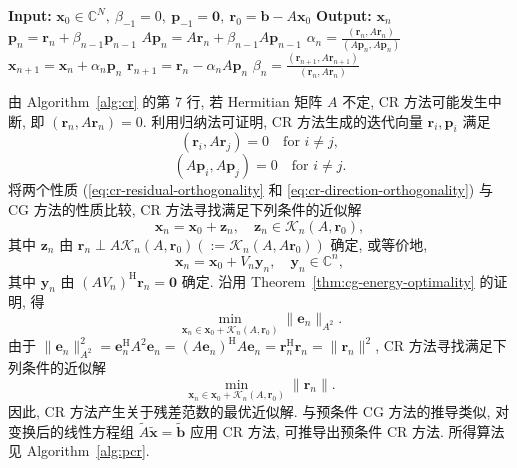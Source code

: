 \begin{algorithm}[H]\caption{{CR 方法}}\label{alg:cr}\begin{algorithmic}[1]
\Statex\textbf{Input:} $\bm x_0\in\mathbb C^N,\ \beta_{-1}=0,\ \bm p_{-1}=\bm0,\ \bm r_0=\bm b-A\bm x_0$
\Statex\textbf{Output:} $\bm x_n$
\State $\bm p_n=\bm r_n+\beta_{n-1}\bm p_{n-1}$
\State $A\bm p_n=A\bm r_n+\beta_{n-1}A\bm p_{n-1}$
\State $\alpha_n=\frac{(\bm r_n,A\bm r_n)}{(A\bm p_n,A\bm p_n)}$
\State $\bm x_{n+1}=\bm x_n+\alpha_n\bm p_n$
\State $\bm r_{n+1}=\bm r_n-\alpha_nA\bm p_n$
\State $\beta_n=\frac{(\bm r_{n+1},A\bm r_{n+1})}{(\bm r_n,A\bm r_n)}$
\EndFor\end{algorithmic}\end{algorithm}
{由 Algorithm\ \ref{alg:cr} 的第 7 行, 若 Hermitian 矩阵 $A$ 不定, CR 方法可能发生中断, 即 $(\bm r_n,A\bm r_n)=0$. 利用归纳法可证明, CR 方法生成的迭代向量 $\bm r_i,\bm p_i$ 满足}
\begin{equation}\label{eq:cr-residual-orthogonality}(\bm r_i,A\bm r_j)=0\quad\text{for }i\ne j,\end{equation}
\begin{equation}\label{eq:cr-direction-orthogonality}(A\bm p_i,A\bm p_j)=0\quad\text{for }i\ne j.\end{equation}
{将两个性质 (\eqref{eq:cr-residual-orthogonality} 和 \eqref{eq:cr-direction-orthogonality}) 与 CG 方法的性质比较, CR 方法寻找满足下列条件的近似解}
\[\bm x_n=\bm x_0+\bm z_n,\quad\bm z_n\in\mathcal K_n(A,\bm r_0),\]
{其中 $\bm z_n$ 由 $\bm r_n\perp A\mathcal K_n(A,\bm r_0)(:=\mathcal K_n(A,A\bm r_0))$ 确定, 或等价地,}
\[\bm x_n=\bm x_0+V_n\bm y_n,\quad\bm y_n\in\mathbb C^n,\]
{其中 $\bm y_n$ 由 $(AV_n)^{\mathrm H}\bm r_n=\bm0$ 确定. 沿用 Theorem\ \ref{thm:cg-energy-optimality} 的证明, 得}
\[\min_{\bm x_n\in\bm x_0+\mathcal K_n(A,\bm r_0)}\|\bm e_n\|_{A^2}.\]
{由于 $\|\bm e_n\|_{A^2}^2=\bm e_n^{\mathrm H}A^2\bm e_n=(A\bm e_n)^{\mathrm H}A\bm e_n=\bm r_n^{\mathrm H}\bm r_n=\|\bm r_n\|^2$, CR 方法寻找满足下列条件的近似解}
\[\min_{\bm x_n\in\bm x_0+\mathcal K_n(A,\bm r_0)}\|\bm r_n\|.\]
{因此, CR 方法产生关于残差范数的最优近似解. 与预条件 CG 方法的推导类似, 对变换后的线性方程组 $\widetilde A\widetilde{\bm x}=\widetilde{\bm b}$ 应用 CR 方法, 可推导出预条件 CR 方法. 所得算法见 Algorithm\ \ref{alg:pcr}.}
